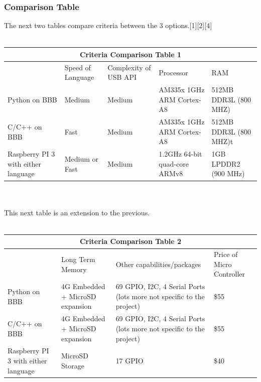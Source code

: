 \documentclass[10pt,draftclsnofoot,onecolumn,retainorgcmds]{IEEEtran}
\begin{document}
\subsubsection{Comparison Table} 
The next two tables compare criteria between the 3 options.[1][2][4]\\ \\
\begin{table}
\centering
\begin{tabular}{ |p{2cm}|p{2cm}|p{2cm}| p{2cm}|p{2cm}| }
	\hline
	\multicolumn{5}{|c|}{Criteria Comparison Table 1} \\
	\hline
	&Speed of Language&Complexity of USB API&Processor&RAM\\
	\hline
	Python on BBB&Medium &Medium&AM335x 1GHz ARM Cortex-A8&512MB DDR3L (800 MHZ) \\
	\hline
	C/C++ on BBB &Fast& Medium&AM335x 1GHz ARM Cortex-A8&512MB DDR3L (800 MHZ)t \\
	\hline
	Raspberry PI 3 with either language &Medium or Fast&Medium&1.2GHz 64-bit quad-core ARMv8&1GB LPDDR2 (900 MHz) \\
	\hline
\end{tabular}
\end{table}
\\ \\ This next table is an extension to the previous. \\ \\
\begin{table}
	\centering
\begin{tabular}{ |p{2cm}|p{2cm}|p{2cm}| p{2cm}| }
	\hline
	\multicolumn{4}{|c|}{Criteria Comparison Table 2} \\
	\hline
	&Long Term Memory&Other capabilities/packages&Price of Micro Controller\\
	\hline
	Python on BBB &4G Embedded + MicroSD expansion&69 GPIO, I2C, 4 Serial Ports (lots more not specific to the project)&\$55 \\
	\hline
	C/C++ on BBB &4G Embedded + MicroSD expansion&69 GPIO, I2C, 4 Serial Ports (lots more not specific to the project)&\$55 \\
	\hline
	Raspberry PI 3 with either language &MicroSD Storage &17 GPIO &\$40 \\
	\hline
\end{tabular}
\end{table}
\vspace{1cm}
\end{document}
